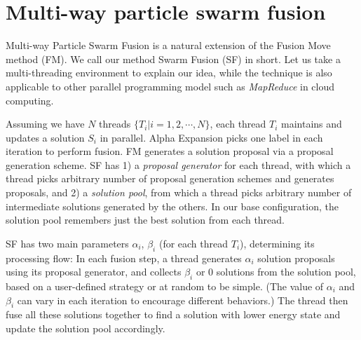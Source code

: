 \section{Multi-way particle swarm fusion}
Multi-way Particle Swarm Fusion is a natural extension of the Fusion
Move method (FM). We call our method Swarm Fusion (SF) in short. Let us
take a multi-threading environment to explain our idea, while the
technique is also applicable to other parallel programming model such as
{\it MapReduce} in cloud computing.
%

Assuming we have $N$ threads $\{T_i | i=1, 2, \cdots, N\}$, each thread
$T_i$ maintains and updates a solution $S_i$ in parallel. Alpha
Expansion picks one label in each iteration to perform fusion. FM
generates a solution proposal via a proposal generation scheme.
SF has 1) a {\it proposal generator} for each thread, with which a thread
picks arbitrary number of proposal generation schemes and generates proposals, and 2) a
{\it solution pool}, from which a thread picks arbitrary number of
intermediate solutions generated by the others.
%
%
In our base configuration, the solution pool remembers just the best
solution from each thread.

SF has two main parameters $\alpha_i$, $\beta_i$ (for each thread
$T_i$), determining its processing flow: In each fusion step, a thread
generates $\alpha_i$ solution proposals using its proposal generator, and collects
$\beta_i$ or $0$ solutions from the solution pool, based on a user-defined
strategy or at random to be simple. (The value of $\alpha_i$ and $\beta_i$ can vary in each iteration to encourage different behaviors.) The thread then fuse all these solutions
together to find a solution with lower energy state and update the solution pool accordingly.
%


